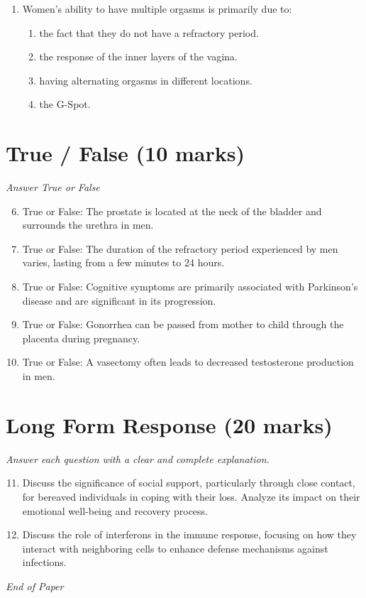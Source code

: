 \documentclass[12pt]{article}
\begin{document}
\begin{enumerate}[label=\arabic*.]
\begin{enumerate}[label=(\alph*)]
    \item fourth pharyngeal arch.
\end{enumerate}
\item Women's ability to have multiple orgasms is primarily due to:
\begin{enumerate}[label=(\alph*)]
    \item the fact that they do not have a refractory period.
    \item the response of the inner layers of the vagina.
    \item having alternating orgasms in different locations.
    \item the G-Spot.
\end{enumerate}
\end{enumerate}

\section*{True / False (10 marks)}
\textit{Answer True or False}
\begin{enumerate}[label=\arabic*.]
\setcounter{enumi}{5}
\item True or False: The prostate is located at the neck of the bladder and surrounds the urethra in men.
\item True or False: The duration of the refractory period experienced by men varies, lasting from a few minutes to 24 hours.
\item True or False: Cognitive symptoms are primarily associated with Parkinson's disease and are significant in its progression.
\item True or False: Gonorrhea can be passed from mother to child through the placenta during pregnancy.
\item True or False: A vasectomy often leads to decreased testosterone production in men.
\end{enumerate}

\section*{Long Form Response (20 marks)}
\textit{Answer each question with a clear and complete explanation.}
\begin{enumerate}[label=\arabic*.]
\setcounter{enumi}{10}
\item Discuss the significance of social support, particularly through close contact, for bereaved individuals in coping with their loss. Analyze its impact on their emotional well-being and recovery process.
\item Discuss the role of interferons in the immune response, focusing on how they interact with neighboring cells to enhance defense mechanisms against infections.
\end{enumerate}

\vfill
\noindent\textit{End of Paper}
\end{document}
